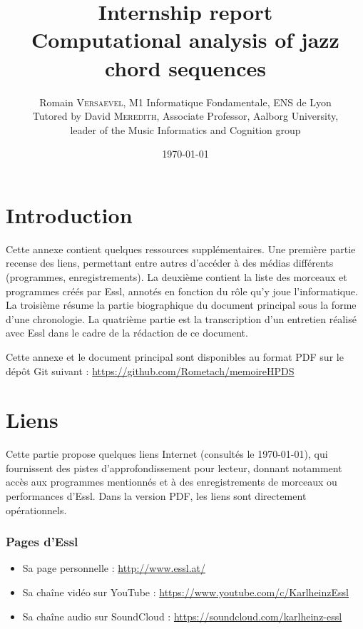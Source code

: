 \documentclass[a4paper,12pt]{article}
\title{\Large Internship report \\ \LARGE Computational analysis of jazz chord sequences}
\author{\normalsize Romain \textsc{Versaevel}, M1 Informatique Fondamentale, ENS de Lyon\\
\normalsize Tutored by David \textsc{Meredith}, Associate Professor, Aalborg University,\\
\normalsize leader of the Music Informatics and Cognition group\\}
\date{\today}
\begin{document}

\tableofcontents

\newpage
\section{Introduction}

Cette annexe contient quelques ressources supplémentaires. Une première partie recense des liens, permettant entre autres d'accéder à des médias différents (programmes, enregistrements). La deuxième contient la liste des morceaux et programmes créés par Essl, annotés en fonction du rôle qu'y joue l'informatique. La troisième résume la partie biographique du document principal sous la forme d'une chronologie. La quatrième partie est la transcription d'un entretien réalisé avec Essl dans le cadre de la rédaction de ce document.

Cette annexe et le document principal sont disponibles au format PDF sur le dépôt Git suivant :
\href{https://github.com/Rometach/memoireHPDS}{https://github.com/Rometach/memoireHPDS}

\newpage
\section{Liens}

Cette partie propose quelques liens Internet (consultés le \today), qui fournissent des pistes d'approfondissement pour lecteur, donnant notamment accès aux programmes mentionnés et à des enregistrements de morceaux ou performances d'Essl. Dans la version PDF, les liens sont directement opérationnels.

\subsubsection*{Pages d'Essl}

\begin{itemize}
\item Sa page personnelle : \href{http://www.essl.at/}{http://www.essl.at/}
\item Sa chaîne vidéo sur YouTube : \href{https://www.youtube.com/c/KarlheinzEssl}{https://www.youtube.com/c/KarlheinzEssl}
\item Sa chaîne audio sur SoundCloud : \href{https://soundcloud.com/karlheinz-essl}{https://soundcloud.com/karlheinz-essl}
\end{itemize}
\end{document}
